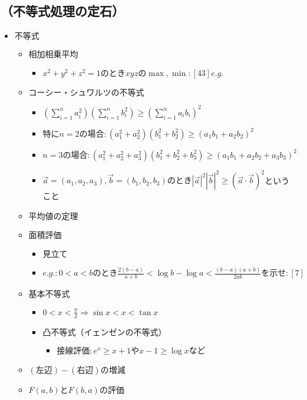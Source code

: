 \documentclass[dvipdfmx,uplatex]{jsarticle}
\begin{document}
\subsection{（不等式処理の定石）}
\begin{itemize}
	\item $ 不等式$
	\begin{itemize}
		\item $ 相加相乗平均$
		\begin{itemize}
			\item $x^2+y^2+z^2=1のときxyzの \max , \min :[43]e.g.$
		\end{itemize}
		\item $ コーシー・シュワルツの不等式$
		\begin{itemize}
			\item ${\displaystyle(\sum_{i=1}^n a_i^2)}{\displaystyle(\sum_{i=1}^n b_i^2)}\geq{\displaystyle(\sum_{i=1}^n a_ib_i)^2}$
			\item $特に n=2 の場合:(a_1^2+a_2^2)(b_1^2+b_2^2)\geq(a_1b_1+a_2b_2)^2$
			\item $n=3 の場合:(a_1^2+a_2^2+a_3^2)(b_1^2+b_2^2+b_3^2)\geq(a_1b_1+a_2b_2+a_3b_3)^2$
			\item $\overrightarrow{a}=(a_1,a_2,a_3), \overrightarrow{b}=(b_1,b_2,b_3)のとき|\overrightarrow{a}|^2|\overrightarrow{b}|^2\geq(\overrightarrow{a}\cdot\overrightarrow{b})^2$ということ
		\end{itemize}
		\item $ 平均値の定理$
		\item $ 面積評価$
		\begin{itemize}
			\item $ 見立て$
			\item $e.g.:0<a<bのとき\frac{2(b-a)}{a+b}< \log b - \log a < \frac{(b-a)(a+b)}{2ab}を示せ:[7]$
		\end{itemize}
		\item $ 基本不等式$
		\begin{itemize}
			\item $ 0 < x < \frac{ \pi }{2} \Rightarrow \sin x < x < \tan x$
			\item $ 凸不等式（イェンゼンの不等式）$
			\begin{itemize}
				\item $ 接線評価:e^x \geq x+1$や$x-1 \geq \log x$など
			\end{itemize}
		\end{itemize}
		\item $ (左辺) - (右辺) の増減$
		\item $ F(a,b) と F(b,a)の評価$

\end{itemize}
\end{itemize}
\end{document}
